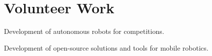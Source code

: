 \documentclass[A4]{deedy-resume} %
\begin{document}
\begin{minipage}[t]{0.66\textwidth}
\section{Volunteer Work}

\sectionspace %


\vspace{\topsep} %
\begin{tightitemize}
 \item Development of autonomous robots for competitions.
 \item Development of open-source solutions and tools for mobile robotics.
\end{tightitemize}






\end{minipage} %

\end{document}

